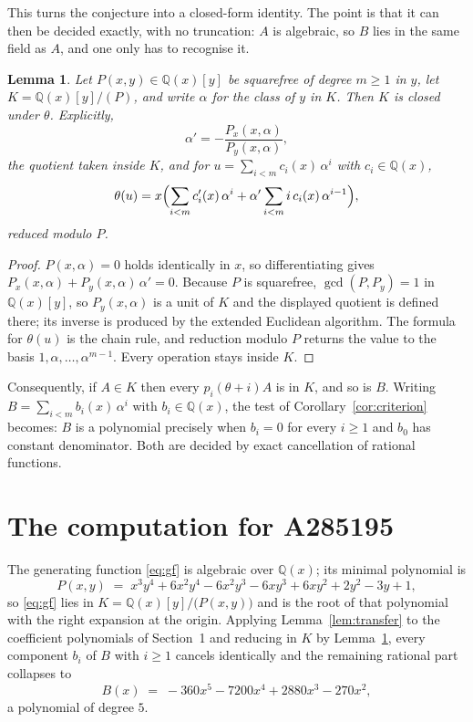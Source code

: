 \documentclass[11pt,a4paper]{article}
\theoremstyle{plain}
\newtheorem{lemma}[theorem]{Lemma}
\theoremstyle{definition}
\begin{document}
This turns the conjecture into a closed-form identity. The point is that it can then be
decided exactly, with no truncation: $A$ is algebraic, so $B$ lies in the same field as
$A$, and one only has to recognise it.

\begin{lemma}\label{lem:field}
Let $P(x,y)\in\mathbb{Q}(x)[y]$ be squarefree of degree $m\ge1$ in $y$, let
$K=\mathbb{Q}(x)[y]/(P)$, and write $\alpha$ for the class of $y$ in $K$. Then $K$ is
closed under $\theta$. Explicitly,
\[
\alpha'=-\frac{P_{x}(x,\alpha)}{P_{y}(x,\alpha)},
\]
the quotient taken inside $K$, and for $u=\sum_{i<m}c_{i}(x)\,\alpha^{i}$ with
$c_{i}\in\mathbb{Q}(x)$,
\[
\theta(u)=x\Bigl(\sum_{i<m}c_{i}'(x)\,\alpha^{i}
 +\alpha'\sum_{i<m}i\,c_{i}(x)\,\alpha^{i-1}\Bigr),
\]
reduced modulo $P$.
\end{lemma}

\begin{proof}
$P(x,\alpha)=0$ holds identically in $x$, so differentiating gives
$P_{x}(x,\alpha)+P_{y}(x,\alpha)\,\alpha'=0$. Because $P$ is squarefree,
$\gcd(P,P_{y})=1$ in $\mathbb{Q}(x)[y]$, so $P_{y}(x,\alpha)$ is a unit of $K$ and the
displayed quotient is defined there; its inverse is produced by the extended Euclidean
algorithm. The formula for $\theta(u)$ is the chain rule, and reduction modulo $P$ returns
the value to the basis $1,\alpha,\dots,\alpha^{m-1}$. Every operation stays inside $K$.
\end{proof}

Consequently, if $A\in K$ then every $p_{i}(\theta+i)A$ is in $K$, and so is $B$. Writing
$B=\sum_{i<m}b_{i}(x)\,\alpha^{i}$ with $b_{i}\in\mathbb{Q}(x)$, the test of
Corollary~\ref{cor:criterion} becomes: $B$ is a polynomial precisely when $b_{i}=0$ for
every $i\ge1$ and $b_{0}$ has constant denominator. Both are decided by exact
cancellation of rational functions.

\section{The computation for A285195}

The generating function \eqref{eq:gf} is algebraic over $\mathbb{Q}(x)$;
its minimal polynomial is
\[
P(x,y) \;=\; x^{3} y^{4} + 6 x^{2} y^{4} - 6 x^{2} y^{3} - 6 x y^{3} + 6 x y^{2} + 2 y^{2} - 3 y + 1 ,
\]
so \eqref{eq:gf} lies in $K=\mathbb{Q}(x)[y]/\bigl(P(x,y)\bigr)$ and is the root of that polynomial with the right
expansion at the origin. Applying Lemma~\ref{lem:transfer} to the coefficient polynomials
of Section~1 and reducing in $K$ by Lemma~\ref{lem:field}, every component $b_{i}$ of $B$
with $i\ge1$ cancels identically and the remaining rational part collapses to
\[
B(x)\;=\;- 360 x^{5} - 7200 x^{4} + 2880 x^{3} - 270 x^{2} ,
\]
a polynomial of degree $5$.
\end{document}
